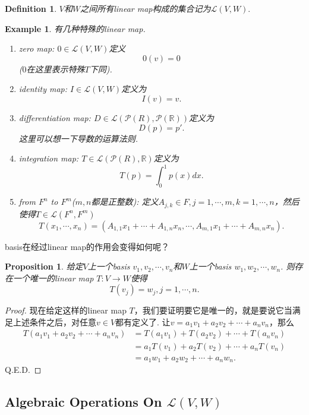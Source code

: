 \documentclass{article}
\newtheorem{proposition}[theorem]{Proposition}
\newtheorem{example}[theorem]{Example}
\newtheorem{definition}[theorem]{Definition}
\newcommand*{\xfunc}[4]{{#2}\colon{#3}{#1}{#4}}
\newcommand*{\func}[3]{\xfunc{\to}{#1}{#2}{#3}}
\begin{document}
\begin{definition}
\rm $V$和$W$之间所有linear map构成的集合记为$\mathcal{L}(V,W).$
\end{definition}

\begin{example}
\rm 有几种特殊的linear map.
\begin{enumerate}
	\item zero map: $0 \in \mathcal{L}(V,W)$定义\[0(v)=0\]($0$在这里表示特殊$T$下同).
	\item identity map: $I \in \mathcal{L}(V,W)$定义为\[I(v)=v.\]
	\item differentiation map: $D \in \mathcal{L}(\mathcal{P}({R}),\mathcal{P}(\mathbb{R}))$定义为\[D(p) = p'.\] 这里可以想一下导数的运算法则.
	\item integration map: $T \in \mathcal{L}(\mathcal{P}({R}),\mathbb{R})$定义为\[T(p) = \int_{0}^{1} p(x)dx.\]
	\item from $F^n$ to $F^m$($m,n$都是正整数): 定义$A_{j,k} \in F, j = 1,\cdots,m , k = 1,\cdots,n$，然后使得$T \in \mathcal{L}(F^n,F^m)$
	$$
		T(x_1,\cdots,x_n) = (A_{1,1}x_1+\cdots+A_{1,n}x_n,\cdots,A_{m,1}x_1+\cdots+A_{m,n}x_n).
	$$
\end{enumerate}
\end{example}


{\color{red} basis在经过linear map的作用会变得如何呢}？

\begin{proposition}\label{lm: unique}
\rm 给定$V$上一个basis $v_1,v_2,\cdots,v_n$和$W$上一个basis $w_1,w_2,\cdots,w_n$. 则存在一个唯一的linear map $\func{T}{V}{W}$使得
$$
	T(v_j) = w_j, j = 1,\cdots,n.
$$
\end{proposition}

\begin{proof}
现在给定这样的linear map $T$，我们要证明要它是唯一的，就是要说它当满足上述条件之后，对任意$v \in V$都有定义了. 让$v = a_1v_1+a_2v_2+\cdots+a_nv_n$，那么
$$
\begin{aligned}
T(a_1v_1+a_2v_2+\cdots+a_nv_n) &= T(a_1v_1) + T(a_2v_2) + \cdots + T(a_nv_n)\\
 &= a_1T(v_1) + a_2T(v_2) + \cdots + a_nT(v_n)\\
 &= a_1w_1 + a_2w_2 + \cdots + a_nw_n.
\end{aligned}
$$
Q.E.D.
\end{proof}

\newpage
\subsection{Algebraic Operations On $\mathcal{L}(V,W)$}
\end{document}
